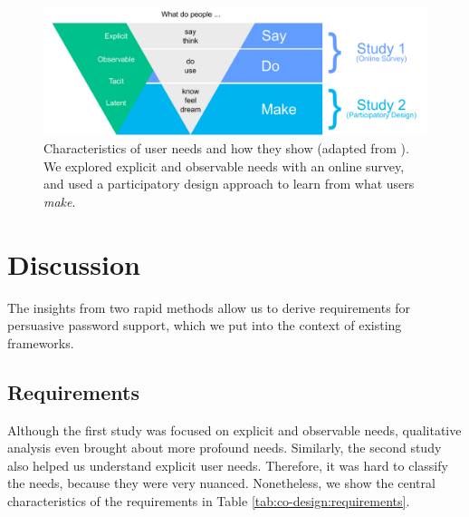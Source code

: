 
\begin{figure}
	\centering
	\includegraphics[width=\linewidth]{figures/co-design/exploration-overview}
	\caption{\label{fig:co-design:exploration-overview} Characteristics of user needs and how they show (adapted from  \cite{Sanders2002ParticipatoryDesign}). We explored explicit and observable needs with an online survey, and used a participatory design approach to learn from what users \textit{make}.}
\end{figure}



		
		


\section{Discussion}
The insights from two rapid methods allow us to derive requirements for persuasive password support, which we put into the context of existing frameworks. 

\subsection{Requirements}
Although the first study was focused on explicit and observable needs, qualitative analysis even brought about more profound needs. Similarly, the second study also helped us understand explicit user needs. Therefore, it was hard to classify the needs, because they were very nuanced. Nonetheless, we show the central characteristics of the requirements in Table \ref{tab:co-design:requirements}.


